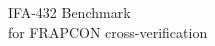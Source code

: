 \begin{frame}{}
    \centering
    \Huge{IFA-432 Benchmark}\\
    \large{for FRAPCON cross-verification}
\end{frame}
